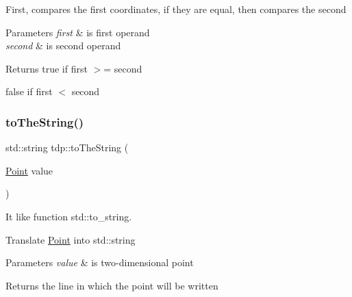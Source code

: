 First, compares the first coordinates, if they are equal, then compares the second 
\begin{DoxyParams}{Parameters}
{\em first} & is first operand \\
\hline
{\em second} & is second operand \\
\hline
\end{DoxyParams}
\begin{DoxyReturn}{Returns}
true if \textquotesingle{}first\textquotesingle{} $>$= \textquotesingle{}second\textquotesingle{} 

false if \textquotesingle{}first\textquotesingle{} $<$ \textquotesingle{}second\textquotesingle{} 
\end{DoxyReturn}
\mbox{\label{namespacetdp_ade7149690123950b10455ece39159e94}} 
\subsubsection{\texorpdfstring{to\+The\+String()}{toTheString()}}
{\footnotesize\ttfamily std\+::string tdp\+::to\+The\+String (\begin{DoxyParamCaption}\item[{\mbox{\hyperlink{structtdp_1_1_point}{Point}}}]{value }\end{DoxyParamCaption})}



It like function std\+::to\+\_\+string. 

Translate \mbox{\hyperlink{structtdp_1_1_point}{Point}} into std\+::string 
\begin{DoxyParams}{Parameters}
{\em value} & is two-\/dimensional point \\
\hline
\end{DoxyParams}
\begin{DoxyReturn}{Returns}
the line in which the point will be written 
\end{DoxyReturn}
